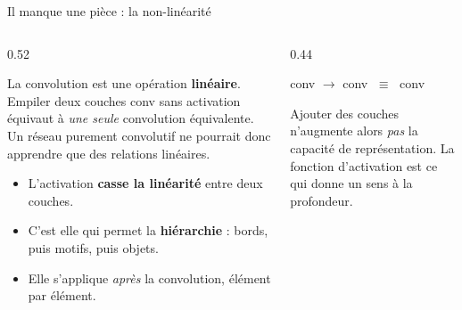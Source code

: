\begin{frame}{Il manque une pièce : la non-linéarité}
\begin{columns}[t]
\begin{column}{0.52\textwidth}
\begin{wbox}
La convolution est une opération \textbf{linéaire}. Empiler deux couches
conv sans activation équivaut à \emph{une seule} convolution équivalente.
Un réseau purement convolutif ne pourrait donc apprendre que des relations
linéaires.
\end{wbox}
\begin{itemize}
  \item L'activation \textbf{casse la linéarité} entre deux couches.
  \item C'est elle qui permet la \textbf{hiérarchie} : bords, puis motifs,
  puis objets.
  \item Elle s'applique \emph{après} la convolution, élément par élément.
\end{itemize}
\end{column}
\begin{column}{0.44\textwidth}
\begin{kbox}
\begin{center}
conv $\to$ conv $\;\equiv\;$ conv
\end{center}
Ajouter des couches n'augmente alors \emph{pas} la capacité de représentation.
La fonction d'activation est ce qui donne un sens à la profondeur.
\end{kbox}
\end{column}
\end{columns}
\end{frame}

